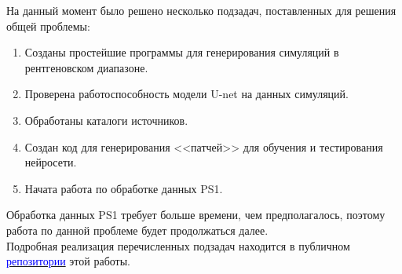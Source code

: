 \Conclusion %

На данный момент было решено несколько подзадач, поставленных для решения общей проблемы:

\begin{enumerate}
    \item Созданы простейшие программы для генерирования симуляций в рентгеновском диапазоне.
    \item Проверена работоспособность модели U-net на данных симуляций.
    \item Обработаны каталоги источников.
    \item Создан код для генерирования <<патчей>> для обучения и тестирования нейросети.
    \item Начата работа по обработке данных PS1.
\end{enumerate} 

Обработка данных PS1 требует больше времени, чем предполагалось, поэтому работа по данной проблеме 
будет продолжаться далее. \\

Подробная реализация перечисленных подзадач находится в публичном  
\href{https://github.com/rt2122/data-segmentation}{\textcolor{blue}{репозитории}} этой работы. 

